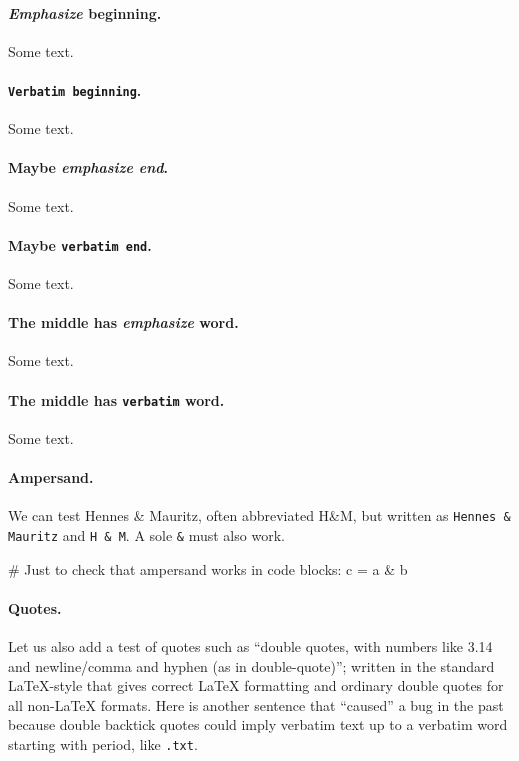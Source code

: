 \documentclass[%
oneside,                 %
final,                   %
10pt]{article}
\theoremstyle{definition}
\begin{document}
\begin{enumerate}
\paragraph{\emph{Emphasize} beginning.}
Some text.

\paragraph{\texttt{Verbatim beginning}.}
Some text.

\paragraph{Maybe \emph{emphasize end}.}
Some text.

\paragraph{Maybe \texttt{verbatim end}.}
Some text.

\paragraph{The middle has \emph{emphasize} word.}
Some text.

\paragraph{The middle has \texttt{verbatim} word.}
Some text.

\paragraph{Ampersand.}
We can test Hennes {\&} Mauritz, often abbreviated H{\&}M, but written
as \Verb!Hennes & Mauritz! and \Verb!H & M!.
A sole \Verb!&! must also work.

\bccq
# Just to check that ampersand works in code blocks:
c = a & b
\eccq

\paragraph{Quotes.}
Let us also add a test of quotes such as ``double quotes, with numbers
like 3.14 and newline/comma and hyphen (as in double-quote)''; written
in the standard LaTeX-style that gives correct {\LaTeX} formatting and
ordinary double quotes for all non-LaTeX formats.  Here is another
sentence that ``caused'' a bug in the past because double backtick
quotes could imply verbatim text up to a verbatim word starting with
period, like \texttt{.txt}.


\end{enumerate}
\end{document}
